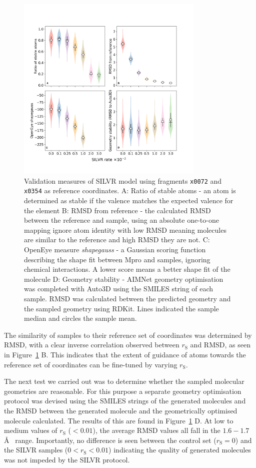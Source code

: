 \documentclass[journal=jacsat,manuscript=article]{achemso}
\begin{document}
\begin{figure}[ht!]
    \centering
    \includegraphics[width=0.8\textwidth]{paper/Figures/Fig3/fig_3_metrics_violins.png}
    \caption{Validation measures of SILVR model using fragments \texttt{x0072} and \texttt{x0354} as reference coordinates. A: Ratio of stable atoms - an atom is determined as stable if the valence matches the expected valence for the element B: RMSD from reference - the calculated RMSD between the reference and sample, using an absolute one-to-one mapping ignore atom identity with low RMSD meaning molecules are similar to the reference and high RMSD they are not. C: OpenEye measure \textit{shapegauss} - a Gaussian scoring function describing the shape fit between Mpro and samples, ignoring chemical interactions. A lower score means a better shape fit of the molecule D: Geometry stability - AIMNet geometry optimisation was completed with Auto3D using the SMILES string of each sample. RMSD was calculated between the predicted geometry and the sampled geometry using RDKit. Lines indicated the sample median and circles the sample mean.}
    \label{fig:measures}
\end{figure}
The similarity of samples to their reference set of coordinates was determined by RMSD, with a clear inverse correlation observed between $r_{\mathrm{S}}$ and RMSD, as seen in Figure~\ref{fig:measures} B. This indicates that the extent of guidance of atoms towards the reference set of coordinates can be fine-tuned by varying $r_{\mathrm{S}}$. 

The next test we carried out was to determine whether the sampled molecular geometries are reasonable. For this purpose a separate geometry optimisation protocol was devised using the SMILES strings of the generated molecules and the RMSD between the generated molecule and the geometrically optimised molecule calculated. The results of this are found in Figure~\ref{fig:measures} D. At low to medium values of $r_{\mathrm{S}}$ ($< 0.01$), the average RMSD values all fall in the $1.6 - 1.7$ \AA~  range. Importantly, no difference is seen between the control set ($r_{\mathrm{S}}=0$) and the SILVR samples ($0 < r_{\mathrm{S}} < 0.01$) indicating the quality of generated molecules was not impeded by the SILVR protocol. 
\end{document}
